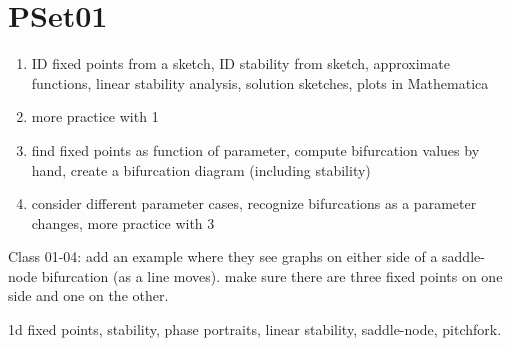 \documentclass[12pt,letterpaper]{exam}
\begin{document}
 \pdfpageheight 11in 
  \pdfpagewidth 8.5in
\section{PSet01}
\begin{enumerate}
\itemsep0pt
\item ID fixed points from a sketch, ID stability from sketch, approximate functions, linear stability analysis, solution sketches, plots in Mathematica
\item more practice with 1
\item find fixed points as function of parameter, compute bifurcation values by hand, create a bifurcation diagram (including stability)
\item consider different parameter cases, recognize bifurcations as a parameter changes, more practice with 3
\end{enumerate}

Class 01-04:
add an example where they see graphs on either side of a saddle-node bifurcation (as a line moves).  make sure there are three fixed points on one side and one on the other.

1d fixed points, stability, phase portraits, linear stability, saddle-node, pitchfork.
\end{document}
